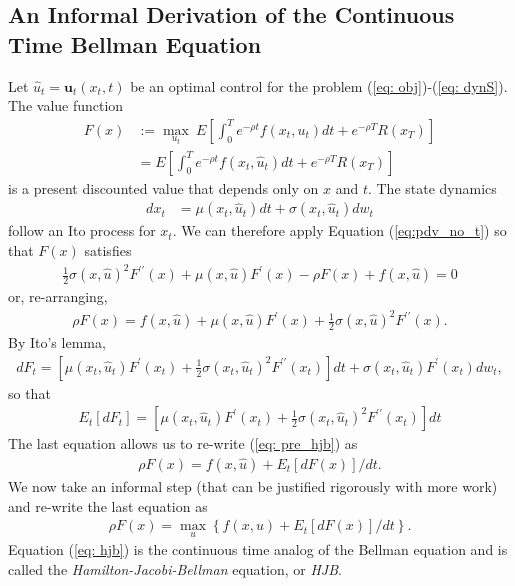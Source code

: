 \documentclass[\topdir/lecture\_notes.tex]{subfiles}
\begin{document}
\subsection{An Informal Derivation of the Continuous Time Bellman Equation}
Let $\hat{u}_t = \mathbf{u}_t(x_t,t)$ be an optimal control for the problem (\ref{eq: obj})-(\ref{eq: dynS}). The value function
\begin{align*}
    F(x) &:= \max_{u_t}\: E\left[\int_{0}^{T} e^{-\rho t} f(x_t, u_t) dt+e^{-\rho T} R(x_T) \right] \\
    &= E\left[\int_{0}^{T} e^{-\rho t} f(x_t, \hat{u}_t) dt+e^{-\rho T} R(x_T) \right]
\end{align*}
is a present discounted value that depends only on $x$ and $t$. The state dynamics
\begin{align*}
dx_t &= \mu(x_t, \hat{u}_t) dt+ \sigma(x_t,\hat{u}_t) dw_t
\end{align*}
follow an Ito process for $x_t$. We can therefore apply Equation (\ref{eq:pdv_no_t}) so that $F(x)$ satisfies
\begin{align*}
\frac{1}{2} \sigma(x,\hat{u})^{2} F^{\prime \prime}(x)+\mu(x,\hat{u}) F^{\prime}(x)-\rho F(x)+f(x,\hat{u})=0
\end{align*}
or, re-arranging,
\begin{align}
\rho F(x) = f(x,\hat{u}) + \mu(x,\hat{u}) F^{\prime}(x) + \frac{1}{2} \sigma(x,\hat{u})^{2} F^{\prime \prime}(x). \label{eq: pre_hjb}
\end{align}
By Ito's lemma, 
\begin{align*}
dF_t = \left[\mu(x_t,\hat{u}_t) F^{\prime}(x_t) + \frac{1}{2} \sigma(x_t,\hat{u}_t)^{2} F^{\prime \prime}(x_t)\right]dt+\sigma(x_t,\hat{u}_t) F^{\prime}(x_t) dw_t,
\end{align*}
so that
\begin{align*}
E_t[dF_t] = \left[\mu(x_t,\hat{u}_t) F^{\prime}(x_t) + \frac{1}{2} \sigma(x_t,\hat{u}_t)^{2} F^{\prime \prime}(x_t)\right]dt 
\end{align*}
The last equation allows us to re-write (\ref{eq: pre_hjb}) as 
\begin{align*}
\rho F(x) = f(x,\hat{u}) + E_t[dF(x)]/dt. 
\end{align*}
We now take an informal step (that can be justified rigorously with more work) and re-write the last equation as
\begin{align}
\rho F(x) = \max_u \left\{ f(x,u) + E_t[dF(x)]/dt \right\}. \label{eq: hjb}
\end{align}
Equation (\ref{eq: hjb}) is the continuous time analog of the Bellman equation and is called the \emph{Hamilton-Jacobi-Bellman} equation, or \emph{HJB}.
\end{document}
